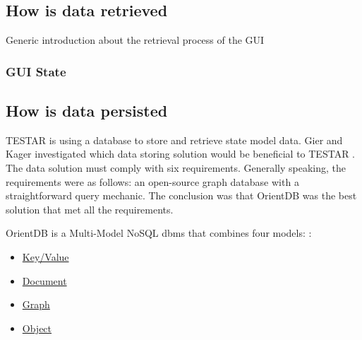 
\subsection{How is data retrieved}

    Generic introduction about the retrieval process of the GUI

    
    \subsubsection{GUI State} \label{gui-state}




\subsection{How is data persisted}

    TESTAR is using a database to store and retrieve state model data. Gier and Kager investigated which data storing solution would be beneficial to TESTAR \cite{GierKager}. The data solution must comply with six requirements. Generally speaking, the requirements were as follows: an open-source graph database with a straightforward query mechanic. The conclusion was that OrientDB was the best solution that met all the requirements. 
    
    OrientDB is a Multi-Model NoSQL \acrfull{dbms} that combines four models: \cite{orientDbModeling}:
   \begin{samepage}
        \begin{itemize}
            \item \hyperlink{db:key-value}{Key/Value}
            \item \hyperlink{db:document}{Document}
            \item \hyperlink{db:graph}{Graph}
            \item \hyperlink{db:object}{Object}
        \end{itemize}
    \end{samepage}

